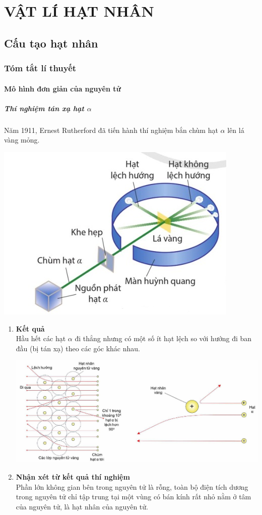 \chapter{VẬT LÍ HẠT NHÂN}
\section{Cấu tạo hạt nhân}
\subsection{Tóm tắt lí thuyết}
\begin{tomtat}
	\subsubsection{Mô hình đơn giản của nguyên tử}
	\paragraph{Thí nghiệm tán xạ hạt $\alpha$}
	Năm 1911, Ernest Rutherford đã tiến hành thí nghiệm bắn chùm hạt $\alpha$ lên lá vàng mỏng.
	\begin{center}
		\includegraphics[width=0.4\linewidth]{figs/VN12-Y24-PH-SYL-025-1}
	\end{center}
	\begin{enumerate}[label=\bfseries \alph*)]
		\item \textbf{Kết quả}\\
		Hầu hết các hạt $\alpha$ đi thẳng nhưng có một số ít hạt lệch so với hướng đi ban đầu (bị tán xạ) theo các góc khác nhau.
		\begin{center}
			\includegraphics[width=0.9\linewidth]{figs/VN12-Y24-PH-SYL-025-2}
		\end{center}
		\item \textbf{Nhận xét từ kết quả thí nghiệm}\\
		Phần lớn không gian bên trong nguyên tử là rỗng, toàn bộ điện tích dương trong nguyên tử chỉ tập trung tại một vùng có bán kính rất nhỏ nằm ở tâm của nguyên tử, là hạt nhân của nguyên tử.
	\end{enumerate}

\end{tomtat}
